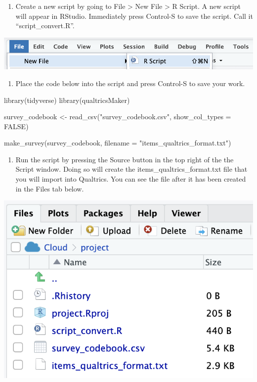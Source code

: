\documentclass[
]{krantz}
\makeatletter
\newenvironment{Shaded}{\begin{snugshade}}{\end{snugshade}}
\newcommand{\AttributeTok}[1]{\textcolor[rgb]{0.61,0.61,0.61}{#1}}
\newcommand{\ConstantTok}[1]{\textcolor[rgb]{0,0,0}{#1}}
\newcommand{\FunctionTok}[1]{\textcolor[rgb]{0,0,0}{#1}}
\newcommand{\NormalTok}[1]{#1}
\newcommand{\OtherTok}[1]{\textcolor[rgb]{0.37,0.37,0.37}{#1}}
\newcommand{\StringTok}[1]{\textcolor[rgb]{0.5,0.5,0.5}{#1}}
\providecommand{\tightlist}{%
  \setlength{\itemsep}{0pt}\setlength{\parskip}{0pt}}
\newenvironment{kframe}{%
\medskip{}
\setlength{\fboxsep}{.8em}
 \def\at@end@of@kframe{}%
 \ifinner\ifhmode%
  \def\at@end@of@kframe{\end{minipage}}%
  \begin{minipage}{\columnwidth}%
 \fi\fi%
 \def\FrameCommand##1{\hskip\@totalleftmargin \hskip-\fboxsep
 \colorbox{shadecolor}{##1}\hskip-\fboxsep
     \hskip-\linewidth \hskip-\@totalleftmargin \hskip\columnwidth}%
 \MakeFramed {\advance\hsize-\width
   \@totalleftmargin\z@ \linewidth\hsize
   \@setminipage}}%
 {\par\unskip\endMakeFramed%
 \at@end@of@kframe}
\renewenvironment{Shaded}{\begin{kframe}}{\end{kframe}}
\makeatother
\begin{document}
\begin{enumerate}
\def\labelenumi{\arabic{enumi}.}
\setcounter{enumi}{5}
\tightlist
\item
  Create a new script by going to File \textgreater{} New File \textgreater{} R Script. A new script will appear in RStudio. Immediately press Control-S to save the script. Call it ``script\_convert.R''.
\end{enumerate}

\includegraphics[width=0.5\linewidth]{ch_qualtrics/images/screenshot_new_script_RSC}

\begin{enumerate}
\def\labelenumi{\arabic{enumi}.}
\setcounter{enumi}{6}
\tightlist
\item
  Place the code below into the script and press Control-S to save your work.
\end{enumerate}

\begin{Shaded}
\begin{Highlighting}[]
\FunctionTok{library}\NormalTok{(tidyverse)}
\FunctionTok{library}\NormalTok{(qualtricsMaker)}

\NormalTok{survey\_codebook }\OtherTok{\textless{}{-}} \FunctionTok{read\_csv}\NormalTok{(}\StringTok{"survey\_codebook.csv"}\NormalTok{,}
                            \AttributeTok{show\_col\_types =} \ConstantTok{FALSE}\NormalTok{)}

\FunctionTok{make\_survey}\NormalTok{(survey\_codebook,}
            \AttributeTok{filename =} \StringTok{"items\_qualtrics\_format.txt"}\NormalTok{)}
\end{Highlighting}
\end{Shaded}

\begin{enumerate}
\def\labelenumi{\arabic{enumi}.}
\setcounter{enumi}{7}
\tightlist
\item
  Run the script by pressing the Source button in the top right of the the Script window. Doing so will create the items\_qualtrics\_format.txt file that you will import into Qualtrics. You can see the file after it has been created in the Files tab below.
\end{enumerate}

\includegraphics[width=0.5\linewidth]{ch_qualtrics/images/screenshot_post_creation_RSC}
\end{document}
